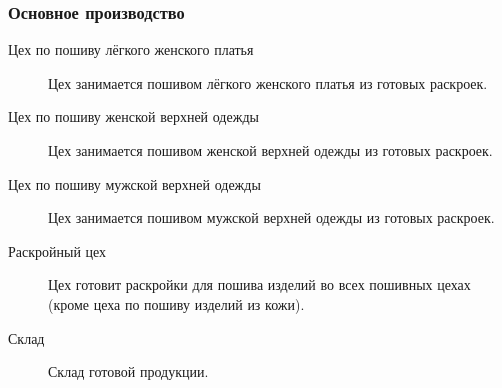 \subsubsection{Основное производство}
\begin{description}
\item [Цех по пошиву лёгкого женского платья]
  Цех занимается пошивом лёгкого женского платья из готовых раскроек.
\item [Цех по пошиву женской верхней одежды]
  Цех занимается пошивом женской верхней одежды из готовых раскроек.
\item [Цех по пошиву мужской верхней одежды]
  Цех занимается пошивом мужской верхней одежды из готовых раскроек.
\item [Раскройный цех]
  Цех готовит раскройки для пошива изделий во всех пошивных цехах (кроме цеха по пошиву изделий из кожи).
\item [Склад]
  Склад готовой продукции.
\end{description}
